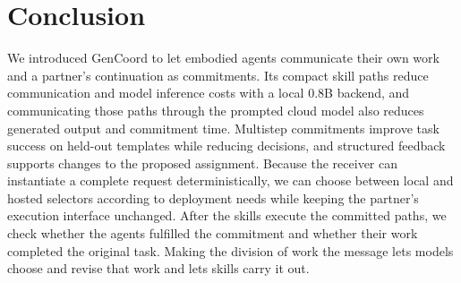 \documentclass[sigconf,nonacm,balance=false]{aamas}
\begin{document}
\section{Conclusion}
We introduced GenCoord to let embodied agents communicate their own work and a partner's continuation as commitments. Its compact skill paths reduce communication and model inference costs with a local 0.8B backend, and communicating those paths through the prompted cloud model also reduces generated output and commitment time. Multistep commitments improve task success on held-out templates while reducing decisions, and structured feedback supports changes to the proposed assignment. Because the receiver can instantiate a complete request deterministically, we can choose between local and hosted selectors according to deployment needs while keeping the partner's execution interface unchanged. After the skills execute the committed paths, we check whether the agents fulfilled the commitment and whether their work completed the original task. Making the division of work the message lets models choose and revise that work and lets skills carry it out.

\clearpage




\makeatletter{}\let\hyper@natlinkend\@empty\makeatother
\end{document}
